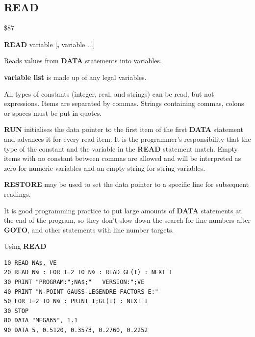 \subsection{READ}
\begin{description}[leftmargin=2cm,style=nextline]
\item [Token:]    \$87

\item [Format:]   {\bf READ} variable [{\bf,} variable ...]

\item [Usage:]    Reads values from {\bf DATA} statements into variables.

                  {\bf variable list} is made up of any legal variables.

                  All types of constants (integer, real, and strings) can be read, but not expressions. Items are separated by commas. Strings containing commas, colons or spaces must be put in quotes.

                  {\bf RUN} initialises the data pointer to the first item of the first {\bf DATA} statement and advances it for every read item. It is the programmer's responsibility that the type of the constant and the variable in the {\bf READ} statement match. Empty items with no constant between commas are allowed and will be interpreted as zero for numeric variables and an empty string for string variables.

                  {\bf RESTORE} may be used to set the data pointer to a specific line for subsequent readings.

\item [Remarks:]  It is good programming practice to put large amounts of {\bf DATA} statements at the end of the program, so they don't slow down the search for line numbers after {\bf GOTO}, and other statements with line number targets.

\item [Example:]  Using {\bf READ}

\begin{tcolorbox}[colback=black,coltext=white]
\verbatimfont{\codefont}
\begin{verbatim}
10 READ NA$, VE
20 READ N% : FOR I=2 TO N% : READ GL(I) : NEXT I
30 PRINT "PROGRAM:";NA$;"   VERSION:";VE
40 PRINT "N-POINT GAUSS-LEGENDRE FACTORS E:"
50 FOR I=2 TO N% : PRINT I;GL(I) : NEXT I
30 STOP
80 DATA "MEGA65", 1.1
90 DATA 5, 0.5120, 0.3573, 0.2760, 0.2252
\end{verbatim}
\end{tcolorbox}
\end{description}

